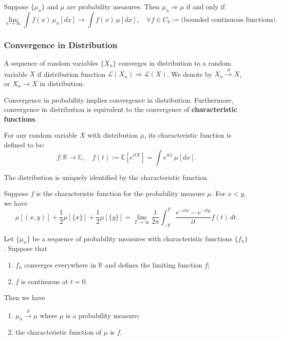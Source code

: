 \begin{prop}
    Suppose \( \{ \mu_n \} \) and \( \mu \) are probability measures. Then \( \mu_n \Rightarrow \mu \) if and only if
\[
\lim_{n \to \infty} \int f(x) \, \mu_n[d x] \to \int f(x) \, \mu[d x], \quad \forall f \in C_b:=\text{(bounded continuous functions)}.
\]
\end{prop}

\subsubsection{Convergence in Distribution}
\begin{defn}
    A sequence of random variables \( \{ X_n \} \) converges in distribution to a random variable \( X \) if distribution function \( \mathcal{L}(X_n) \Rightarrow \mathcal{L}(X) \). We denote by \( X_n \xrightarrow{d} X \), or \( X_n \to X \) in distribution.
\end{defn}
Convergence in probability implies convergence in distribution. Furthermore, convergence in distribution is equivalent to the convergence of \textbf{characteristic functions}.

\begin{defn}
For any random variable $X$ with distribution $\mu$, its characteristic function is defined to be:
\[
f: \mathbb{R} \to \mathbb{C}, \quad f(t) := \mathbb{E}\left[e^{itX}\right] = \int e^{itx} \, \mu[dx].
\]
\end{defn}

The distribution is uniquely identified by the characteristic function.
\begin{thm}
Suppose $f$ is the characteristic function for the probability measure $\mu$. For $x < y$, we have
\[
\mu[(x, y)] + \frac{1}{2}\mu[\{x\}] + \frac{1}{2}\mu[\{y\}] = \lim_{T \to \infty} \frac{1}{2\pi} \int_{-T}^{T} \frac{e^{-itx} - e^{-ity}}{it} f(t) \, dt.
\]
\end{thm}

\begin{thm}
Let $\{\mu_n\}$ be a sequence of probability measures with characteristic functions $\{f_n\}$. Suppose that
\begin{enumerate}
    \item $f_n$ converges everywhere in $\mathbb{R}$ and defines the limiting function $f$;
    \item $f$ is continuous at $t = 0$.
\end{enumerate}
Then we have
\begin{enumerate}
    \item $\mu_n \xrightarrow{d} \mu$ where $\mu$ is a probability measure;
    \item the characteristic function of $\mu$ is $f$.
\end{enumerate}
\end{thm}

